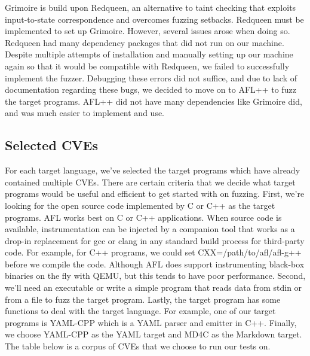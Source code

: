 \documentclass[12pt]{diazessay}
\begin{document}
Grimoire is build upon Redqueen, an alternative to taint checking that exploits input-to-state correspondence and overcomes fuzzing setbacks. 
Redqueen must be implemented to set up Grimoire. However, several issues arose when doing so. Redqueen had many dependency packages that did not run on our machine. 
Despite multiple attempts of installation and manually setting up our machine again so that it would be compatible with Redqueen, we failed to successfully implement the fuzzer. Debugging these errors did not suffice, and due to lack of documentation regarding these bugs, we decided to move on to AFL++ to fuzz the target programs. 
AFL++ did not have many dependencies like Grimoire did, and was much easier to implement and use. 

\subsection*{Selected CVEs}


For each target language, we’ve selected the target programs which have already contained multiple CVEs. There are certain criteria that we decide what target programs would be useful and efficient to get started with on fuzzing.  First, we’re looking for the open source code implemented by C or C++ as the target programs.  AFL works best on C or C++ applications. When source code is available, instrumentation can be injected by a companion tool that works as a drop-in replacement for gcc or clang in any standard build process for third-party code. For example, for C++ programs, we could set CXX=/path/to/afl/afl-g++ before we compile the code. Although AFL does support instrumenting black-box binaries on the fly with QEMU, but this tends to have poor performance. Second, we’ll need an executable or write a simple program that reads data from stdin or from a file to fuzz the target program. Lastly, the target program has some functions to deal with the target language. For example, one of our target programs is YAML-CPP which is a YAML parser and emitter in C++. Finally, we choose YAML-CPP as the YAML target and MD4C as the Markdown target.
The table below is a corpus of CVEs that we choose to run our tests on.
\end{document}
